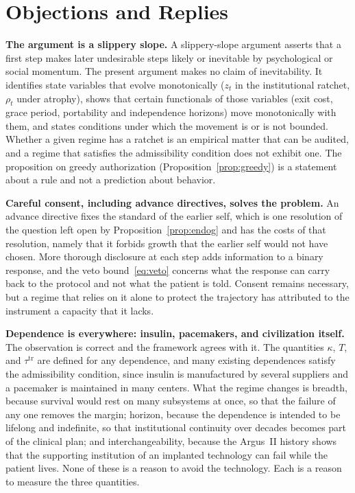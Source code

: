 \documentclass[11pt]{article}
\theoremstyle{plain}
\theoremstyle{definition}
\theoremstyle{remark}
\begin{document}
\section{Objections and Replies}\label{sec:objections}

\textbf{The argument is a slippery slope.} A slippery-slope argument asserts that a first step makes later undesirable steps likely or inevitable by psychological or social momentum. The present argument makes no claim of inevitability. It identifies state variables that evolve monotonically ($z_t$ in the institutional ratchet, $\rho_t$ under atrophy), shows that certain functionals of those variables (exit cost, grace period, portability and independence horizons) move monotonically with them, and states conditions under which the movement is or is not bounded. Whether a given regime has a ratchet is an empirical matter that can be audited, and a regime that satisfies the admissibility condition does not exhibit one. The proposition on greedy authorization (Proposition~\ref{prop:greedy}) is a statement about a rule and not a prediction about behavior.

\textbf{Careful consent, including advance directives, solves the problem.} An advance directive fixes the standard of the earlier self, which is one resolution of the question left open by Proposition~\ref{prop:endog} and has the costs of that resolution, namely that it forbids growth that the earlier self would not have chosen. More thorough disclosure at each step adds information to a binary response, and the veto bound~\eqref{eq:veto} concerns what the response can carry back to the protocol and not what the patient is told. Consent remains necessary, but a regime that relies on it alone to protect the trajectory has attributed to the instrument a capacity that it lacks.

\textbf{Dependence is everywhere: insulin, pacemakers, and civilization itself.} The observation is correct and the framework agrees with it. The quantities $\kappa$, $T$, and $\tau^{\mathrm{tr}}$ are defined for any dependence, and many existing dependences satisfy the admissibility condition, since insulin is manufactured by several suppliers and a pacemaker is maintained in many centers. What the regime changes is breadth, because survival would rest on many subsystems at once, so that the failure of any one removes the margin; horizon, because the dependence is intended to be lifelong and indefinite, so that institutional continuity over decades becomes part of the clinical plan; and interchangeability, because the Argus~II history shows that the supporting institution of an implanted technology can fail while the patient lives. None of these is a reason to avoid the technology. Each is a reason to measure the three quantities.
\end{document}
